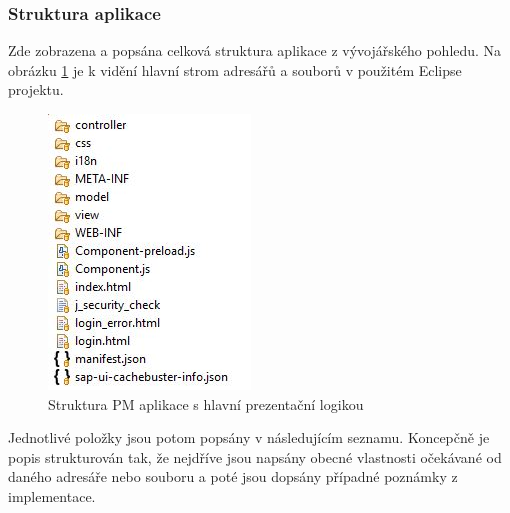\documentclass[thesis=M,czech]{FITthesis}[2012/06/26]
\begin{document}
\subsubsection{Struktura aplikace}
Zde zobrazena a popsána celková struktura aplikace z vývojářského pohledu. Na obrázku \ref{img:pmfiori_app_struct} je k vidění hlavní strom adresářů a souborů v použitém Eclipse projektu. 

\begin{figure}[H]
	\centering
	\includegraphics[]{images/fiori_app_struct}
	\caption{Struktura PM aplikace s hlavní prezentační logikou}
	\label{img:pmfiori_app_struct}
\end{figure}

Jednotlivé položky jsou potom popsány v následujícím seznamu. Koncepčně je popis strukturován tak, že nejdříve jsou napsány obecné vlastnosti očekávané od daného adresáře nebo souboru a poté jsou dopsány případné poznámky z implementace.
\end{document}
